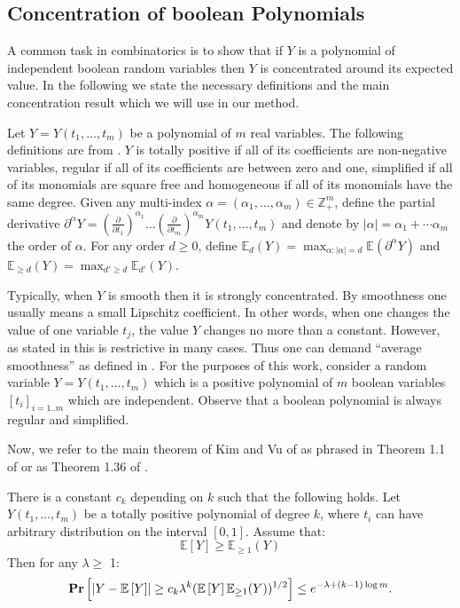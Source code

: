 \documentclass{llncs}
\newcommand{\hide}[1]{}
\newcommand{\field}[1]{\mathbb{#1}} \renewcommand{\vec}[1]{{\mbox{\boldmath$#1$}}}
\newcommand{\beql}[1]{\begin{equation}\label{#1}}
\newcommand{\eeq}{\end{equation}}
\newcommand{\Abs}[1]{{\left|{#1}\right|}}
\newcommand{\Mean}[1]{{\mathbb E}\left[{#1}\right]}
\newcommand{\Prob}[1]{{{\bf{Pr}}\left[{#1}\right]}}
\begin{document}
\subsection{Concentration of boolean Polynomials}
A common task in combinatorics is to show that if $Y$ is a polynomial
of independent boolean random variables then $Y$ is concentrated 
around its expected value. In the following we state the necessary definitions
and the main concentration result which we will use in our method. 

Let $Y=Y(t_1,\ldots,t_m)$ be a polynomial of $m$ real variables. The following definitions are from \cite{tao-vu}.
$Y$ is totally positive if all of its coefficients are non-negative variables,
regular if all of its coefficients are between zero and one, 
simplified if all of its monomials are square free and homogeneous if all of its monomials have the same degree. 
Given any multi-index $\alpha=(\alpha_1,\ldots,\alpha_m) \in \field{Z}^m_{+}$, define the partial derivative
${\partial^{\alpha}Y}= ( \frac{\partial}{\partial t_1} )^{\alpha_1} \ldots ( \frac{\partial}{\partial t_m} )^{\alpha_m} Y(t_1,\ldots,t_m)$
and denote by $\Abs{\alpha} = {\alpha_1}+\cdots{\alpha_m}$ the order of $\alpha$.
For any order $d \geq 0$, define ${\mathbb E}_d(Y)=\max_{\alpha:|\alpha|=d}{\mathbb E}(\partial^{\alpha}Y)$
and ${\mathbb E}_{\ge d}(Y) =\max_{d' \ge d}{\mathbb E}_{d'}(Y)$.


Typically, when $Y$ is smooth then it is strongly concentrated. 
By smoothness one usually means a small Lipschitz coefficient. In other words, when one changes the value of one 
variable $t_j$, the value $Y$ changes no more than a constant. However, as stated in \cite{vu} this is 
restrictive in many cases. Thus one can demand ``average smoothness'' as defined in \cite{vu}. 
For the purposes of this work, consider a random variable $Y=Y(t_1,\ldots,t_m)$ which is a positive polynomial 
of $m$ boolean variables $[t_i]_{i=1..m}$ which are independent. Observe that a boolean polynomial
is always regular and simplified.

Now, we refer to the main theorem of Kim and Vu of \cite[\S1.2]{kim-vu} as phrased in Theorem 1.1 of \cite{vu} or as Theorem 1.36\hide{\footnote{The notation $g(n)=O_k(f(n))$ means that there is a constant $d_k$ which depends on $k$ such that  $g(n) \leq d_k f(n)$ for all $n$.}} of \cite{tao-vu}.

\begin{theorem}
\label{thrm:kim-vu}
There is a constant $c_k$ depending on $k$ such that the following holds.
Let $Y(t_1, \ldots, t_m)$ be a totally positive polynomial of degree $k$, where $t_i$ can have arbitrary
distribution on the interval $[0, 1]$. Assume that:
\beql{cond1}
\Mean{Y} \ge {\mathbb E}_{\ge 1}(Y) 
\eeq
Then for any $\lambda \ge $ 1:
\beql{res1}
\Prob{\Abs{Y-\Mean{Y}} \ge c_k \lambda^k (\Mean{Y} {\mathbb E}_{\ge 1}(Y))^{1/2}} \le e^{-\lambda + (k-1)\log m}.
\eeq
\end{theorem}
\end{document}
